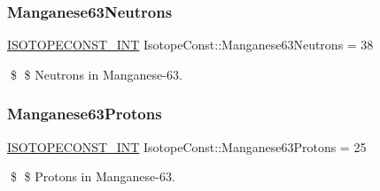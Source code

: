 \subsubsection{\texorpdfstring{Manganese63\+Neutrons}{Manganese63Neutrons}}
{\footnotesize\ttfamily \mbox{\hyperlink{group___isotope_const-_macros_ga5f18360b3e99483a35c32d789e62621c}{I\+S\+O\+T\+O\+P\+E\+C\+O\+N\+S\+T\+\_\+\+I\+NT}} Isotope\+Const\+::\+Manganese63\+Neutrons = 38}

\$ \$ Neutrons in Manganese-\/63. \mbox{\label{group___isotope_const-_manganese-_mn63_ga1b09d94399131cdc514a0baf28d161a1}} 
\subsubsection{\texorpdfstring{Manganese63\+Protons}{Manganese63Protons}}
{\footnotesize\ttfamily \mbox{\hyperlink{group___isotope_const-_macros_ga5f18360b3e99483a35c32d789e62621c}{I\+S\+O\+T\+O\+P\+E\+C\+O\+N\+S\+T\+\_\+\+I\+NT}} Isotope\+Const\+::\+Manganese63\+Protons = 25}

\$ \$ Protons in Manganese-\/63. 